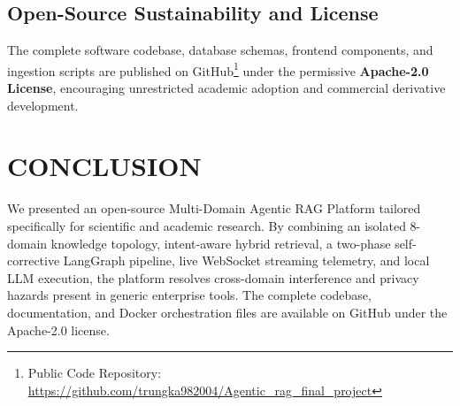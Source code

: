 \documentclass[conference]{IEEEtran}
\begin{document}
\subsection{Open-Source Sustainability and License}
The complete software codebase, database schemas, frontend components, and ingestion scripts are published on GitHub\footnote{Public Code Repository: \url{https://github.com/trungka982004/Agentic_rag_final_project}} under the permissive \textbf{Apache-2.0 License}, encouraging unrestricted academic adoption and commercial derivative development.

\section{CONCLUSION}
We presented an open-source Multi-Domain Agentic RAG Platform tailored specifically for scientific and academic research. By combining an isolated 8-domain knowledge topology, intent-aware hybrid retrieval, a two-phase self-corrective LangGraph pipeline, live WebSocket streaming telemetry, and local LLM execution, the platform resolves cross-domain interference and privacy hazards present in generic enterprise tools. The complete codebase, documentation, and Docker orchestration files are available on GitHub under the Apache-2.0 license.



\end{document}
